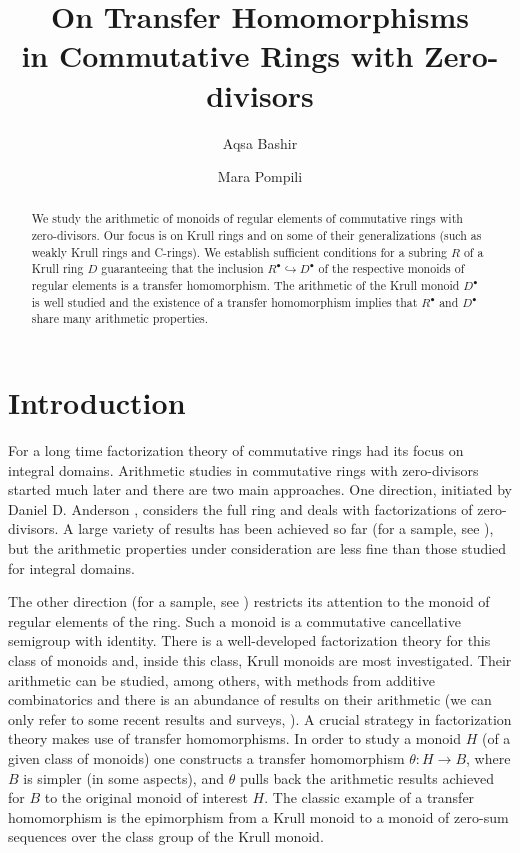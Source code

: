 \documentclass[a4paper, 10pt]{amsart}
\title[On Transfer Homomorphisms in Commutative Rings with Zero-divisors]{On Transfer Homomorphisms \\ in Commutative Rings with Zero-divisors}
\author{Aqsa Bashir}
\author{Mara Pompili}
\theoremstyle{plain}
\theoremstyle{definition}
\theoremstyle{remark}
\numberwithin{equation}{section}
\begin{document}
\begin{abstract}
    We study the arithmetic of monoids of regular elements  of commutative rings with zero-divisors. Our focus is on Krull rings and on some of their generalizations (such as weakly Krull rings and C-rings). We establish sufficient conditions for a subring $R$ of a Krull ring $D$ guaranteeing that the inclusion $R^{\bullet} \hookrightarrow D^{\bullet}$ of the respective monoids of regular elements is a transfer homomorphism. The arithmetic of the Krull monoid $D^{\bullet}$ is well studied and the existence of a transfer homomorphism implies that $R^{\bullet}$ and $D^{\bullet}$ share many arithmetic properties.
\end{abstract}

\maketitle



\section{Introduction} \label{1}
For a long time factorization theory of commutative rings had its focus on integral domains. Arithmetic studies in commutative rings with zero-divisors started much later and there are two main approaches. One direction, initiated by Daniel D. Anderson \cite{AM85, AVL96}, considers the full ring and deals with factorizations of zero-divisors. A large variety of results has been achieved so far (for a sample, see \cite{AJ17,JM22, JMN21}), but the arithmetic properties under consideration are less fine than those studied for integral domains. 

The other direction (for a sample, see \cite{CO22, GRR15, HZ25}) restricts its attention to the monoid of regular elements of the ring. Such a monoid is a commutative cancellative semigroup with identity. There is a well-developed factorization theory for this class of monoids  and, inside this class, Krull monoids are most investigated. Their arithmetic can be studied, among others,  with methods from additive combinatorics and there is an abundance of results on their arithmetic (we can only refer to some recent results and surveys, \cite{Gri22, Sch16}). A crucial strategy in factorization theory makes use of transfer homomorphisms. In order to study a monoid $H$ (of a given class of monoids) one constructs a transfer homomorphism $\theta \colon H \to B$, where $B$ is simpler (in some aspects), and $\theta$ pulls back the arithmetic results achieved for $B$ to the original monoid of interest $H$. The classic example of a transfer homomorphism is the epimorphism from a Krull monoid to a monoid of zero-sum sequences over the class group of the Krull monoid. 
\end{document}
